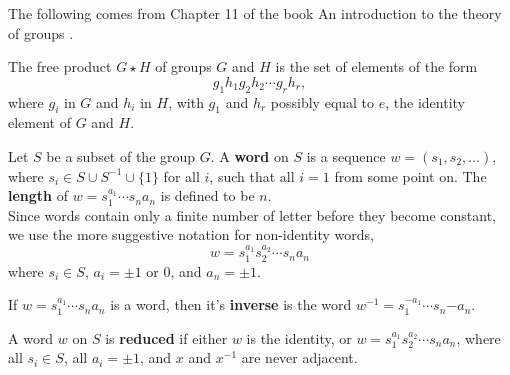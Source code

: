 The following comes from Chapter 11 of the book An introduction to the theory of groups \citep{rotmanFree}.
\begin{definition}
The free product $ G \star H$ of groups $G$ and $H$ is the set of elements of the form
$$ g_1h_1 g_2h_2 \cdots g_r h_r, $$
where $g_i$ in $G$ and $h_i$ in $H$, with $g_1$ and $h_r$ possibly equal to $e$, the identity element of $G$ and $H$.
\end{definition}

\begin{definition}
Let $S$ be a subset of the group $G$.
A \textbf{word} on $S$ is a sequence $w = (s_1,s_2,\ldots)$, where $s_i \in S \cup S^{-1} \cup \{1\}$ for all $i$, such that all $i =1$ from some point on. The \textbf{length} of $w = s_1^{a_1}\cdots s_n{a_n}$ is defined to be $n$.\\
Since words contain only a finite number of letter before they become constant, we use the more suggestive notation for non-identity words,
$$ w = s_1^{a_1}s_2^{a_2}\cdots s_n{a_n}$$
where $s_i \in S$, $a_i = \pm 1$ or $0$, and $a_n = \pm 1$.
\end{definition}
\begin{definition}
If $w =  s_1^{a_1}\cdots s_n{a_n}$ is a word, then it's \textbf{inverse} is the word $w^{-1} =  s_1^{-a_1}\cdots s_n{-a_n}$.
\end{definition}
\begin{definition}
A word $w$ on $S$ is \textbf{reduced} if either $w$ is the identity, or $w = s_1^{a_1} s_2^{a_2}\cdots s_n{a_n} $, where all $s_i \in S$, all $a_i = \pm 1$, and $x$ and $x^{-1}$ are never adjacent.
\end{definition}



